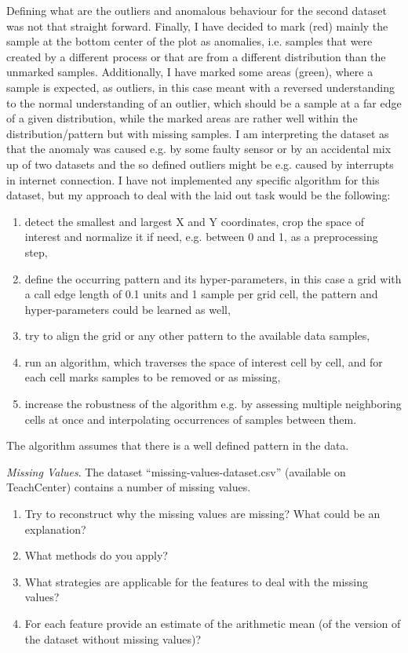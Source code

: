 \documentclass[a4paper,10pt]{article}\setlength{\textheight}{10in}\setlength{\textwidth}{6.5in}\setlength{\topmargin}{-0.125in}\setlength{\oddsidemargin}{-.2in}\setlength{\evensidemargin}{-.2in}\setlength{\headsep}{0.2in}\setlength{\footskip}{0pt}\usepackage{amsmath}\usepackage{fancyhdr}\usepackage{enumitem}\usepackage{hyperref}\usepackage{xcolor}\usepackage{graphicx}\pagestyle{fancy}
\begin{document}
\begin{enumerate}[topsep=0mm, partopsep=0mm, leftmargin=*]
Defining what are the outliers and anomalous behaviour for the second dataset was not that straight forward. Finally, I have decided to mark (red) mainly the sample at the bottom center of the plot as anomalies, i.e. samples that were created by a different process or that are from a different distribution than the unmarked samples. Additionally, I have marked some areas (green), where a sample is expected, as outliers, in this case meant with a reversed understanding to the normal understanding of an outlier, which should be a sample at a far edge of a given distribution, while the marked areas are rather well within the distribution/pattern but with missing samples. I am interpreting the dataset as that the anomaly was caused e.g. by some faulty sensor or by an accidental mix up of two datasets and the so defined outliers might be e.g. caused by interrupts in internet connection. I have not implemented any specific algorithm for this dataset, but my approach to deal with the laid out task would be the following:
\begin{enumerate}
    \item detect the smallest and largest X and Y coordinates, crop the space of interest and normalize it if need, e.g. between 0 and 1, as a preprocessing step,
    \item define the occurring pattern and its hyper-parameters, in this case a grid with a call edge length of 0.1 units and 1 sample per grid cell, the pattern and hyper-parameters could be learned as well,
    \item try to align the grid or any other pattern to the available data samples,
    \item run an algorithm, which traverses the space of interest cell by cell, and for each cell marks samples to be removed or as missing,
    \item increase the robustness of the algorithm e.g. by assessing multiple neighboring cells at once and interpolating occurrences of samples between them. 
\end{enumerate}
The algorithm assumes that there is a well defined pattern in the data.

{\color{blue}
\newpage\item\textit{Missing Values}. The dataset ``missing-values-dataset.csv'' (available on TeachCenter) contains a number of missing values.
\begin{enumerate}
	\item Try to reconstruct why the missing values are missing? What could be an explanation?
	\item What methods do you apply?
	\item What strategies are applicable for the features to deal with the missing values?
	\item For each feature provide an estimate of the arithmetic mean (of the version of the dataset without missing values)?
\end{enumerate}
}


\end{enumerate}
\end{document}
